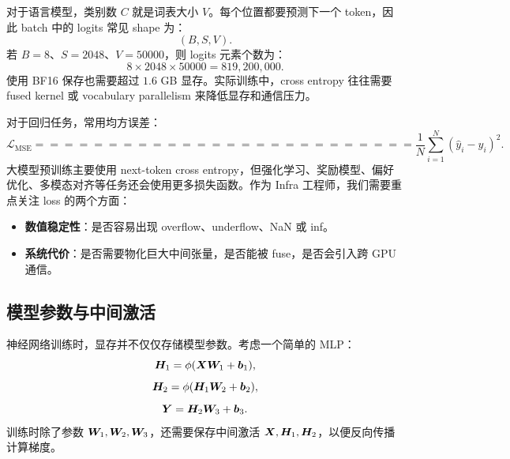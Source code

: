 对于语言模型，类别数 $C$ 就是词表大小 $V$。每个位置都要预测下一个 token，因此 batch 中的 logits 常见 shape 为：
\[
(B,S,V).
\]
若 $B=8$、$S=2048$、$V=50000$，则 logits 元素个数为：
\[
8\times 2048\times 50000=819,200,000.
\]
使用 BF16 保存也需要超过 $1.6$ GB 显存。实际训练中，cross entropy 往往需要 fused kernel 或 vocabulary parallelism 来降低显存和通信压力。

对于回归任务，常用均方误差：
\[
\mathcal{L}_{\mathrm{MSE}}
==========================

\frac{1}{N}\sum_{i=1}^{N}(\hat{y}_i-y_i)^2.
\]
大模型预训练主要使用 next-token cross entropy，但强化学习、奖励模型、偏好优化、多模态对齐等任务还会使用更多损失函数。作为 Infra 工程师，我们需要重点关注 loss 的两个方面：

\begin{itemize}
\item \textbf{数值稳定性}：是否容易出现 overflow、underflow、NaN 或 inf。
\item \textbf{系统代价}：是否需要物化巨大中间张量，是否能被 fuse，是否会引入跨 GPU 通信。
\end{itemize}

\subsection{模型参数与中间激活}
\label{subsec:parameters-and-activations}

神经网络训练时，显存并不仅仅存储模型参数。考虑一个简单的 MLP：
\[
\bm{H}_1=\phi(\bm{X}\bm{W}_1+\bm{b}_1),
\]
\[
\bm{H}_2=\phi(\bm{H}_1\bm{W}_2+\bm{b}_2),
\]
\[
\bm{Y}=\bm{H}_2\bm{W}_3+\bm{b}_3.
\]
训练时除了参数 $\bm{W}_1,\bm{W}_2,\bm{W}_3$，还需要保存中间激活 $\bm{X},\bm{H}_1,\bm{H}_2$，以便反向传播计算梯度。

